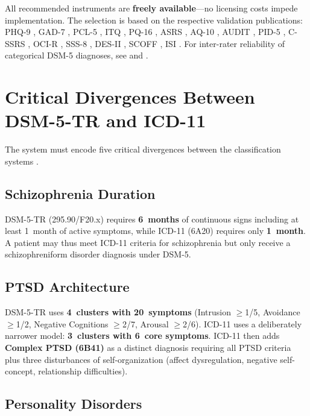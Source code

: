 \documentclass[11pt,a4paper]{article}
\begin{document}
All recommended instruments are \textbf{freely available}---no licensing costs impede implementation. The selection is based on the respective validation publications: PHQ-9 \citep{Levis2019}, GAD-7 \citep{Spitzer2006}, PCL-5 \citep{Blevins2015}, ITQ \citep{Cloitre2018}, PQ-16 \citep{Ising2012}, ASRS \citep{Kessler2005}, AQ-10 \citep{Allison2012}, AUDIT \citep{Saunders1993}, PID-5 \citep{OltmannsWidiger2018, Riegel2021}, C-SSRS \citep{Posner2011}, OCI-R \citep{Foa2002}, SSS-8 \citep{Gierk2014}, DES-II \citep{CarlsonPutnam1993}, SCOFF \citep{Morgan1999}, ISI \citep{Morin2011}. For inter-rater reliability of categorical DSM-5 diagnoses, see \citet{Regier2013} and \citet{Aboraya2006}.

\section{Critical Divergences Between DSM-5-TR and ICD-11}
\label{sec:divergences}

The system must encode five critical divergences between the classification systems \citep{Keeley2016}.

\subsection{Schizophrenia Duration}

DSM-5-TR (295.90/F20.x) requires \textbf{6~months} of continuous signs including at least 1~month of active symptoms, while ICD-11 (6A20) requires only \textbf{1~month}. A patient may thus meet ICD-11 criteria for schizophrenia but only receive a schizophreniform disorder diagnosis under DSM-5.

\subsection{PTSD Architecture}

DSM-5-TR uses \textbf{4~clusters with 20~symptoms} (Intrusion $\geq$1/5, Avoidance $\geq$1/2, Negative Cognitions $\geq$2/7, Arousal $\geq$2/6). ICD-11 uses a deliberately narrower model: \textbf{3~clusters with 6~core symptoms}. ICD-11 then adds \textbf{Complex PTSD (6B41)} as a distinct diagnosis requiring all PTSD criteria plus three disturbances of self-organization (affect dysregulation, negative self-concept, relationship difficulties).

\subsection{Personality Disorders}
\end{document}
